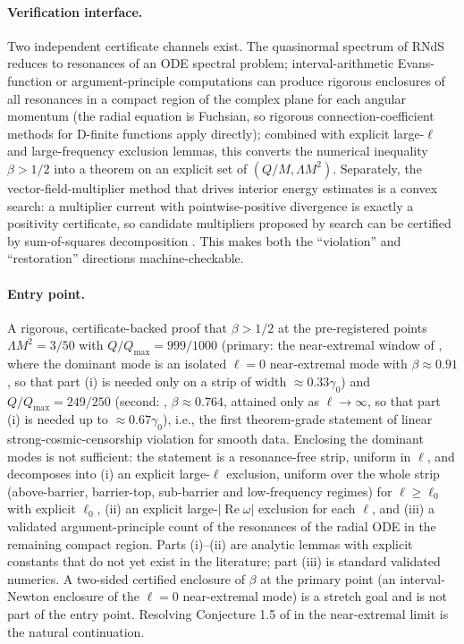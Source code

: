 \documentclass[11pt,letterpaper]{article}
\begin{document}
\paragraph{Verification interface.} Two independent certificate channels exist. The quasinormal spectrum of RNdS reduces to resonances of an ODE spectral problem; interval-arithmetic Evans-function or argument-principle computations \cite{arb2017} can produce rigorous enclosures of all resonances in a compact region of the complex plane for each angular momentum (the radial equation is Fuchsian, so rigorous connection-coefficient methods for D-finite functions \cite{mezzarobba2016} apply directly); combined with explicit large-$\ell$ and large-frequency exclusion lemmas, this converts the numerical inequality $\beta>1/2$ into a theorem on an explicit set of $(Q/M,\Lambda M^2)$. Separately, the vector-field-multiplier method that drives interior energy estimates is a convex search: a multiplier current with pointwise-positive divergence is exactly a positivity certificate, so candidate multipliers proposed by search can be certified by sum-of-squares decomposition \cite{parrilo2003}. This makes both the ``violation'' and ``restoration'' directions machine-checkable.

\paragraph{Entry point.} A rigorous, certificate-backed proof that $\beta>1/2$ at the pre-registered points $\Lambda M^2=3/50$ with $Q/Q_{\max}=999/1000$ (primary: the near-extremal window of \cite[Fig.~3]{cardoso2018}, where the dominant mode is an isolated $\ell=0$ near-extremal mode with $\beta\approx0.91$, so that part (i) is needed only on a strip of width $\approx0.33\gamma_0$) and $Q/Q_{\max}=249/250$ (second: \cite[Table~I]{cardoso2018}, $\beta\approx0.764$, attained only as $\ell\to\infty$, so that part (i) is needed up to $\approx0.67\gamma_0$), i.e., the first theorem-grade statement of linear strong-cosmic-censorship violation for smooth data. Enclosing the dominant modes is not sufficient: the statement is a resonance-free strip, uniform in $\ell$, and decomposes into (i) an explicit large-$\ell$ exclusion, uniform over the whole strip (above-barrier, barrier-top, sub-barrier and low-frequency regimes) for $\ell\ge\ell_0$ with explicit $\ell_0$, (ii) an explicit large-$|\operatorname{Re}\omega|$ exclusion for each $\ell$, and (iii) a validated argument-principle count of the resonances of the radial ODE in the remaining compact region. Parts (i)--(ii) are analytic lemmas with explicit constants that do not yet exist in the literature; part (iii) is standard validated numerics. A two-sided certified enclosure of $\beta$ at the primary point (an interval-Newton enclosure of the $\ell=0$ near-extremal mode) is a stretch goal and is not part of the entry point. Resolving Conjecture 1.5 of \cite{hintz2025} in the near-extremal limit is the natural continuation.
\end{document}
